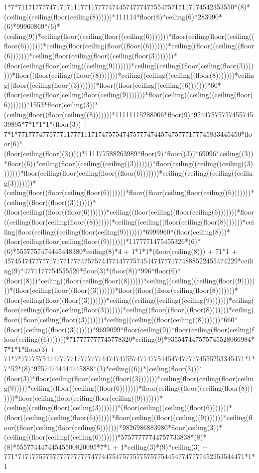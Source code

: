 1*7*71171777747171711177117777474457477747755475717117174542353550*(8)*(ceiling((ceiling(floor(ceiling(8))))))*111114*floor(6)*ceiling(6)*283990*(6)*99960869*(6)*(ceiling(9))*ceiling(floor((ceiling(floor((ceiling(6)))))))*floor(ceiling(floor((ceiling((floor(6)))))))*ceiling(floor(ceiling(floor((floor((6)))))))*ceiling((floor((ceiling((floor(6)))))))*ceiling(floor(ceiling(floor((ceiling(floor(3)))))))*(floor(ceiling(floor(ceiling((ceiling(9)))))))*ceiling((ceiling((floor(ceiling(floor(3)))))))*floor((floor(ceiling((floor((8)))))))*ceiling((ceiling((ceiling((floor(8)))))))*ceiling((floor((ceiling(floor((3)))))))*floor((floor(ceiling((ceiling((6)))))))*60*(floor(ceiling(floor(ceiling(floor(ceiling(9)))))))*floor(ceiling((ceiling((ceiling(floor(6)))))))*1553*floor(ceiling(3))*(ceiling(floor((floor(ceiling((8)))))))*11111115288006*floor(9)*9244757575745574539895*7*1*1*1*(floor(3)) + 7*1*7717774775777117771117174757547475777474457475777177745833445450*floor(6)*(floor(ceiling(floor((3)))))*111177588263989*floor(9)*floor((3))*69096*ceiling((3))*floor((6))*ceiling(floor((ceiling((ceiling((3)))))))*floor(ceiling((ceiling((ceiling((3)))))))*floor(ceiling(floor(ceiling(floor((floor(6)))))))*ceiling((ceiling((ceiling((ceiling(3)))))))*(ceiling(floor((floor(ceiling(floor(6)))))))*floor((floor(ceiling(floor(ceiling((6)))))))*(ceiling((floor((floor((3)))))))*(floor(ceiling((floor((floor(6)))))))*ceiling((floor(ceiling((floor(ceiling(6)))))))*floor((ceiling(floor(ceiling(floor((8)))))))*ceiling((ceiling((floor(ceiling(floor(8)))))))*ceiling(floor(ceiling((ceiling(floor(ceiling(9)))))))*6999960*(floor(ceiling(8)))*(floor(ceiling(floor(ceiling(floor((9)))))))*1177771475455326*(6)*(6)*5557757474445448380*ceiling(8)*4 + 1*1*1*(floor(ceiling(8))) + 71*1 + 4574547477777171771777475757447744777574544747771774888522455474229*ceiling(9)*4771177754555526*floor(3)*(floor(8))*996*floor(6)*(floor((8)))*ceiling((floor(ceiling(floor((8))))))*ceiling((ceiling((ceiling(floor((9)))))))*(floor(ceiling(floor((floor((3)))))))*floor((floor((floor(ceiling(floor(8)))))))*(floor(ceiling(floor((floor((3)))))))*ceiling((ceiling((ceiling((ceiling(9)))))))*ceiling(floor(ceiling((floor(ceiling(floor(3)))))))*ceiling((floor((floor((floor(8)))))))*ceiling(floor((floor(ceiling(floor((3)))))))*ceiling((ceiling((floor(ceiling((8)))))))*660*(floor((ceiling((floor((3)))))))*9699099*floor(ceiling(9))*floor(ceiling(floor(ceiling(floor(ceiling((6)))))))*717777777745778320*ceiling(9)*935547447575745528066984*7*1*1*floor(3) + 71*7*7777575474777771777777744747475574774775445474777774555253345471*1*7*52*(8)*92574744444745888*(3)*ceiling((6))*(ceiling(floor(3)))*(floor(3))*floor(ceiling(floor(ceiling((floor((3)))))))*ceiling(floor(ceiling(floor(ceiling(9)))))*ceiling((floor((ceiling((floor(6)))))))*floor(ceiling((floor((ceiling(floor(8)))))))*floor(ceiling(floor(ceiling(floor(ceiling((9)))))))*(ceiling((ceiling(floor((ceiling(3)))))))*(floor(ceiling((ceiling((floor(6)))))))*(floor((ceiling((ceiling(floor(6)))))))*floor(ceiling((floor((ceiling((9)))))))*ceiling(floor((floor(ceiling(floor(ceiling(6)))))))*9826986883980*floor(ceiling(3))*(ceiling((floor(ceiling((ceiling(6)))))))*57577777744757733838*(8)*(8)*55577444744545500820095*7*1 + 1*ceiling(3)*(9)*ceiling(3) + 771*71717755757777777777747744754757757757577544547747777452253544471*1*1 